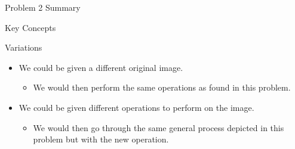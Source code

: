 \begin{summary}{Problem 2 Summary}
\begin{statement}{Key Concepts}
\begin{itemize}
\begin{itemize}
            \end{itemize}
        \end{itemize}
    \end{statement}
    \begin{statement}{Variations}
        \begin{itemize}
            \item We could be given a different original image.
            \begin{itemize}
                \item We would then perform the same operations as found in this problem.
            \end{itemize}
            \item We could be given different operations to perform on the image.
            \begin{itemize}
                \item We would then go through the same general process depicted in this problem but with the new operation.
            \end{itemize}
        \end{itemize}
    \end{statement}
\end{summary}

